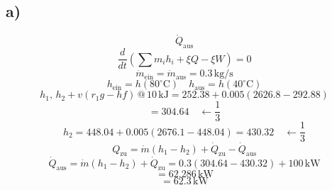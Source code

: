 

\subsection*{a)}
\[
\dot{Q}_{\text{aus}}
\]
\[
\frac{d}{dt} \left( \sum m_i h_i + \xi Q - \xi W \right) = 0
\]
\[
\dot{m}_{\text{ein}} = \dot{m}_{\text{aus}} = 0.3 \, \text{kg/s}
\]
\[
h_{\text{ein}} = h(80^\circ \text{C}) \quad h_{\text{aus}} = h(40^\circ \text{C})
\]
\[
h_1, \, h_2 + v(r_1 g - h f) \, @ \, 10 \, \text{kJ} = 252.38 + 0.005 (2626.8 - 292.88)
\]
\[
= 304.64 \quad \leftarrow \frac{1}{3}
\]
\[
h_2 = 448.04 + 0.005 (2676.1 - 448.04) = 430.32 \quad \leftarrow \frac{1}{3}
\]
\[
Q_{\text{zu}} = \dot{m} (h_1 - h_2) + \dot{Q}_{\text{zu}} - \dot{Q}_{\text{aus}}
\]
\[
\dot{Q}_{\text{aus}} = \dot{m} (h_1 - h_2) + \dot{Q}_{\text{zu}} = 0.3 (304.64 - 430.32) + 100 \, \text{kW}
\]
\[
= 62.286 \, \text{kW}
\]
\[
= 62.3 \, \text{kW}
\]